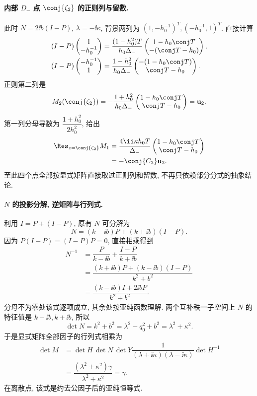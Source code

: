\paragraph{内部 $D_-$ 点 $\conj{\zeta_2}$ 的正则列与留数.}
此时 $N=2\ii b(I-P)$, $\lambda=-\ii\kappa$,
背景两列为 $(1,-h_0^{-1})^T,(-h_0^{-1},1)^T$.
直接计算
\[
\begin{aligned}
(I-P)\begin{pmatrix}1\\-h_0^{-1}\end{pmatrix}
&=\dfrac{(1-h_0^2)T}{h_0\Delta_-}
\begin{pmatrix}1-h_0\conj T\\-(\conj T-h_0)\end{pmatrix},\\
(I-P)\begin{pmatrix}-h_0^{-1}\\1\end{pmatrix}
&=\dfrac{1-h_0^2}{h_0\Delta_-}
\begin{pmatrix}-(1-h_0\conj T)\\\conj T-h_0\end{pmatrix}.
\end{aligned}
\]
正则第二列是
\[
M_2(\conj{\zeta_2})
=-\dfrac{1+h_0^2}{h_0\Delta_-}
\begin{pmatrix}1-h_0\conj T\\\conj T-h_0\end{pmatrix}
=\mathbf u_2.
\]
第一列分母导数为 $\dfrac{1+h_0^2}{2h_0^2}$, 给出
\[
\begin{aligned}
\Res_{z=\conj{\zeta_2}}M_1
&=\dfrac{4\ii\kappa h_0T}{\Delta_-}
\begin{pmatrix}1-h_0\conj T\\\conj T-h_0\end{pmatrix}\\
&=-\conj{C_2}\mathbf u_2.
\end{aligned}
\]
至此四个点全部按显式矩阵直接取过正则列和留数,
不再只依赖部分分式的抽象结论.

\paragraph{$N$ 的投影分解, 逆矩阵与行列式.}
利用 $I=P+(I-P)$, 原有 $N$ 可分解为
\[
N=(k-\ii b)P+(k+\ii b)(I-P).
\]
因为 $P(I-P)=(I-P)P=0$, 直接相乘得到
\[
\begin{aligned}
N^{-1}
&=\dfrac{P}{k-\ii b}+\dfrac{I-P}{k+\ii b}\\
&=\dfrac{(k+\ii b)P+(k-\ii b)(I-P)}{k^2+b^2}\\
&=\dfrac{(k-\ii b)I+2\ii bP}{k^2+b^2}.
\end{aligned}
\]
分母不为零处该式逐项成立, 其余处按亚纯函数理解.
两个互补秩一子空间上 $N$ 的特征值是 $k-\ii b,k+\ii b$,
所以
\[
\det N=k^2+b^2
=\lambda^2-q_0^2+b^2
=\lambda^2+\kappa^2.
\]
于是显式矩阵全部因子的行列式相乘为
\[
\begin{aligned}
\det M
&=\det H\,\det N\,\det Y
\dfrac{1}{(\lambda+\ii\kappa)(\lambda-\ii\kappa)}\det H^{-1}\\
&=\dfrac{(\lambda^2+\kappa^2)\gamma}{\lambda^2+\kappa^2}
=\gamma.
\end{aligned}
\]
在离散点, 该式是约去公因子后的亚纯恒等式.


